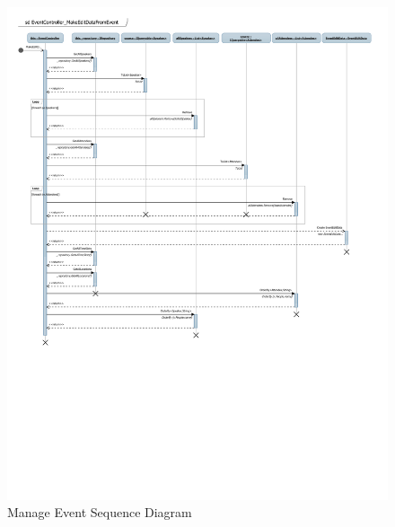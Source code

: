 \documentclass[12pt]{article}
\begin{document}
\begin{figure}[H]
\centering
\caption{Manage Event Sequence Diagram}
\includegraphics[scale=0.8]{ManageEvent_sequence}
\end{figure}
\newpage
\end{document}

